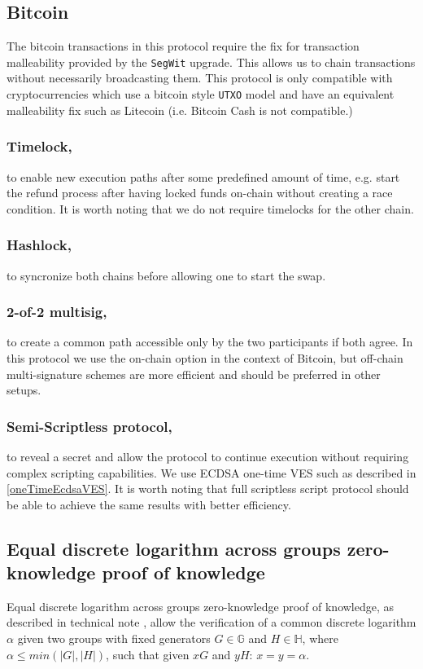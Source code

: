 \documentclass{llncs}
\newcommand{\GG}{\mathbb{G}}
\newcommand{\HH}{\mathbb{H}}
\begin{document}
\subsection{Bitcoin}
\label{bitcoinPrerequisites}
The bitcoin transactions in this protocol require the fix for transaction malleability provided by the \texttt{SegWit} upgrade.  This allows us to chain transactions without necessarily broadcasting them. This protocol is only compatible with cryptocurrencies which use a bitcoin style \texttt{UTXO} model and have an equivalent malleability fix such as Litecoin (i.e. Bitcoin Cash is not compatible.)

\subsubsection{Timelock,}
to enable new execution paths after some predefined amount of time, e.g. start the refund process after having locked funds on-chain without creating a race condition. It is worth noting that we do not require timelocks for the other chain.

\subsubsection{Hashlock,}
to syncronize both chains before allowing one to start the swap.

\subsubsection{2-of-2 multisig,}
to create a common path accessible only by the two participants if both agree. In this protocol we use the on-chain option in the context of Bitcoin, but off-chain multi-signature schemes are more efficient and should be preferred in other setups.

\subsubsection{Semi-Scriptless protocol,}
to reveal a secret and allow the protocol to continue execution without requiring complex scripting capabilities. We use ECDSA one-time VES such as described in \ref{oneTimeEcdsaVES}. It is worth noting that full scriptless script \cite{poelstra-adaptor} protocol should be able to achieve the same results with better efficiency.

\subsection{Equal discrete logarithm across groups zero-knowledge proof of knowledge}
Equal discrete logarithm across groups zero-knowledge proof of knowledge, as described in technical note \cite{MRL0010}, allow the verification of a common discrete logarithm $\alpha$ given two groups with fixed generators $G \in \GG$ and $H \in \HH$, where $\alpha \leq min(|G|,|H|)$, such that given $xG$ and $yH$: $x=y=\alpha$.
\end{document}
